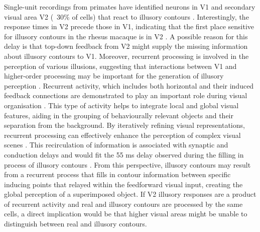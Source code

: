 \documentclass[12pt]{article}
\begin{document}
Single-unit recordings from primates have identified neurons in V1 and secondary visual area V2 (~30\% of cells) that react to illusory contours \autocite{vonderheydtMechanismsContourPerception1989}. Interestingly, the response times in V2 precede those in V1, indicating that the first place sensitive for illusory contours in the rhesus macaque is in V2 \autocite{leeDynamicsSubjectiveContour2001}. A possible reason for this delay is that top-down feedback from V2 might supply the missing information about illusory contours to V1. Moreover, recurrent processing is involved in the perception of various illusions, suggesting that interactions between V1 and higher-order processing may be important for the generation of illusory perception \autocite{deweerdCuedependentDeficitsGrating1996,mendolaRepresentationIllusoryReal1999,panEquivalentRepresentationReal2012}. Recurrent activity, which includes both horizontal and their induced feedback connections are demonstrated to play an important role during visual organisation \autocite{roelfsemaCORTICALALGORITHMSPERCEPTUAL2006}. This type of activity helps to integrate local and global visual features, aiding in the grouping of behaviourally relevant objects and their separation from the background. By iteratively refining visual representations, recurrent processing can effectively enhance the perception of complex visual scenes \autocite{roelfsemaCORTICALALGORITHMSPERCEPTUAL2006,shushruthStrongRecurrentNetworks2012}. This recirculation of information is associated with synaptic and conduction delays and would fit the 55 ms delay observed during the filling in process of illusory contours \autocite{leeDynamicsSubjectiveContour2001,pakTopDownFeedbackControls2020}. From this perspective, illusory contours may result from a recurrent process that fills in contour information between specific inducing points that relayed within the feedforward visual input, creating the global perception of a superimposed object. If V2 illusory responses are a product of recurrent activity and real and illusory contours are processed by the same cells, a direct implication would be that higher visual areas might be unable to distinguish between real and illusory contours.
\bigbreak
\end{document}
